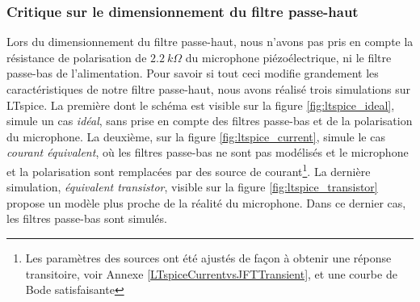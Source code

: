 \subsubsection{Critique sur le dimensionnement du filtre passe-haut}

Lors du dimensionnement du filtre passe-haut, nous n'avons pas pris en compte la résistance de polarisation de $2.2 \ k \Omega$ du microphone piézoélectrique, ni le filtre passe-bas de l'alimentation. Pour savoir si tout ceci modifie grandement les caractéristiques de notre filtre passe-haut, nous avons réalisé trois simulations sur LTspice. La première dont le schéma est visible sur la figure \ref{fig:ltspice_ideal}, simule un cas \textit{idéal}, sans prise en compte des filtres passe-bas et de la polarisation du microphone. La deuxième, sur la figure \ref{fig:ltspice_current}, simule le cas \textit{courant équivalent}, où les filtres passe-bas ne sont pas modélisés et le microphone et la polarisation sont remplacées par des source de courant\footnote{Les paramètres des sources ont été ajustés de façon à obtenir une réponse transitoire, voir Annexe \ref{LTspiceCurrentvsJFTTransient}, et une courbe de Bode satisfaisante}. La dernière simulation, \textit{équivalent transistor}, visible sur la figure \ref{fig:ltspice_transistor} propose un modèle plus proche de la réalité du microphone. Dans ce dernier cas, les filtres passe-bas sont simulés.

